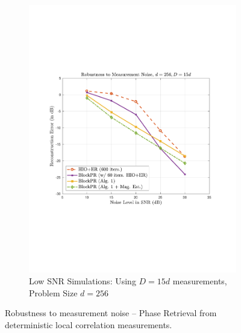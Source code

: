 \begin{figure}[hbtp]
\begin{subfigure}[b]{0.480\textwidth}
\includegraphics[clip=true, trim = 0.75in 2.75in 1in 2.5in,scale=0.45]{pics/robustness_600d}
\caption{Low SNR Simulations: Using $D=15d$ measurements, Problem Size $d=256$}
\label{fig:lowsnr_256}
\end{subfigure}
\caption{Robustness to measurement noise -- Phase Retrieval from 
deterministic local correlation measurements.}
\label{fig:noise-local}
\end{figure}
%

